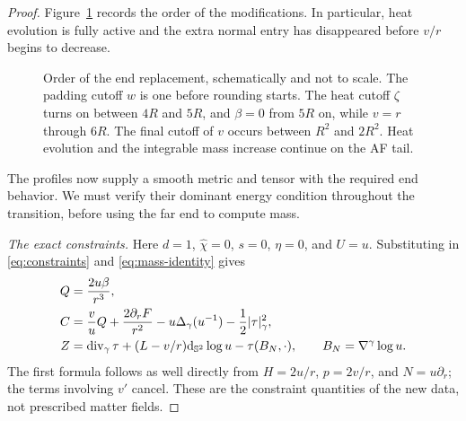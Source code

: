 \begin{proof}
Figure~\ref{fig:stages} records the order of the modifications. In
particular, heat evolution is fully active and the extra normal entry
has disappeared before $v/r$ begins to decrease.
\begin{figure}[!hb]
\centering
{}
\caption{Order of the end replacement, schematically and not to scale.
The padding cutoff $w$ is one before rounding starts. The heat cutoff
$\zeta$ turns on between $4R$ and $5R$, and $\beta=0$ from $5R$ on,
while $v=r$ through $6R$. The final cutoff of $v$ occurs between $R^2$
and $2R^2$. Heat evolution and the integrable mass increase continue
on the AF tail.}\label{fig:stages}
\end{figure}

The profiles now supply a smooth metric and tensor with the required
end behavior. We must verify their dominant energy condition throughout
the transition, before using the far end to compute mass.

\emph{The exact constraints.}
Here $d=1$, $\widehat\chi=0$, $s=0$, $\eta=0$, and $U=u$.
Substituting in \eqref{eq:constraints} and
\eqref{eq:mass-identity} gives
\begin{equation}\label{eq:round-constraints}
 \begin{split}
 Q&=\frac{2u\beta}{r^3},\\
 C&=\frac vu Q+\frac{2\partial_rF}{r^2}
           -u\Delta_\gamma(u^{-1})-\frac12|\tau|_\gamma^2,\\
 Z&=\operatorname{div}_\gamma\tau+(L-v/r)\mathrm d_{\mathbb S^2}\log u
                       -\tau(B_N,\cdot),
 \qquad B_N=\nabla^\gamma\log u.
 \end{split}
\end{equation}
The first formula follows as well directly from
$H=2u/r$, $p=2v/r$, and $N=u\partial_r$; the terms involving
$v'$ cancel. These are the constraint quantities of the new data,
not prescribed matter fields.


\end{proof}
